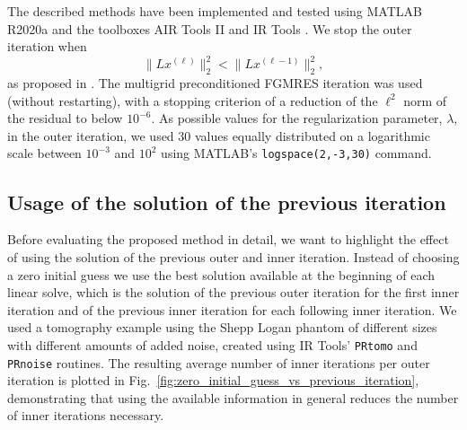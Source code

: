 The described methods have been implemented and tested using MATLAB R2020a and the toolboxes AIR Tools II \cite{art:HANS18} and IR Tools \cite{art:GAZZ19}. We stop the outer iteration when
\[
\|L x^{(\ell)}\|_2^2 < \|L x^{(\ell-1)}\|_2^2,
\]
as proposed in \cite{Gazzola_etal_2020}. The multigrid preconditioned
FGMRES iteration was used (without restarting), with a stopping criterion of a reduction of the $\ell^2$ norm of the residual to below $10^{-6}$. As possible values for the regularization parameter, $\lambda$, in the outer iteration, we used 30 values equally distributed on a logarithmic scale between $10^{-3}$ and $10^{2}$ using MATLAB's \texttt{logspace(2,-3,30)} command.

\subsection{Usage of the solution of the previous iteration}
Before evaluating the proposed method in detail, we want to highlight the effect of using the solution of the previous outer and inner iteration. Instead of choosing a zero initial guess we use the best solution available at the beginning of each linear solve, which is the solution of the previous outer iteration for the first inner iteration and of the previous inner iteration for each following inner iteration. We used a tomography example using the Shepp Logan phantom of different sizes with different amounts of added noise, created using IR Tools' \cite{art:GAZZ19} \texttt{PRtomo} and \texttt{PRnoise} routines. The resulting average number of inner iterations per outer iteration is plotted in Fig.~\ref{fig:zero_initial_guess_vs_previous_iteration}, demonstrating that using the available information in general reduces the number of inner iterations necessary.
